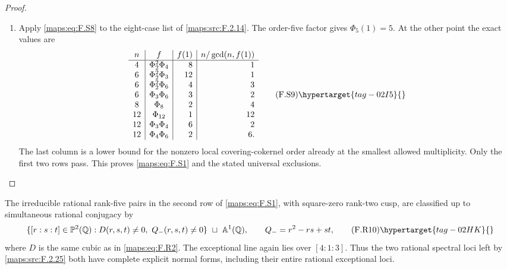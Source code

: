 \begin{proof}
\begin{enumerate}[label={$\langle1\rangle$\arabic*.}]
\item Apply \eqref{maps:eq:F.S8} to the eight-case
list of \ref{maps:src:F.2.14}.  The order-five factor gives $\Phi_5(1)=5$.
At the other point the exact values are
\[
\begin{array}{c|c|r|r}
 n&f&f(1)&n/\gcd(n,f(1))\\\hline
 4&\Phi_2^2\Phi_4&8&1\\
 6&\Phi_2^2\Phi_3&12&1\\
 6&\Phi_2^2\Phi_6&4&3\\
 6&\Phi_3\Phi_6&3&2\\
 8&\Phi_8&2&4\\
 12&\Phi_{12}&1&12\\
 12&\Phi_3\Phi_4&6&2\\
 12&\Phi_4\Phi_6&2&6.
\end{array}
 \tag{F.S9}\hypertarget{tag-02I5}{}\label{maps:eq:F.S9}
\]
The last column is a lower bound for the nonzero local
covering-cokernel order already at the smallest allowed
multiplicity.  Only the first two rows pass.
This proves \eqref{maps:eq:F.S1} and the stated universal exclusions.

\end{enumerate}
\end{proof}




\begin{theorem}\hypertarget{tag-02NG}{}\label{maps:src:F.2.26}


The irreducible rational rank-five pairs in the second row
of \eqref{maps:eq:F.S1}, with square-zero rank-two cusp, are classified
up to simultaneous rational conjugacy by
\[
 \{[r:s:t]\in\mathbb P^2(\mathbb Q):
             D(r,s,t)\ne0,\ Q_-(r,s,t)\ne0\}
       \ \sqcup\ \mathbb A^1(\mathbb Q),
 \qquad Q_-=r^2-rs+st,
 \tag{F.R10}\hypertarget{tag-02HK}{}\label{maps:eq:F.R10}
\]
where $D$ is the same cubic as in \eqref{maps:eq:F.R2}.
The exceptional line again lies over $[4:1:3]$.
Thus the two rational spectral loci left by \ref{maps:src:F.2.25} both
have complete explicit normal forms, including their
entire rational exceptional loci.

\end{theorem}


